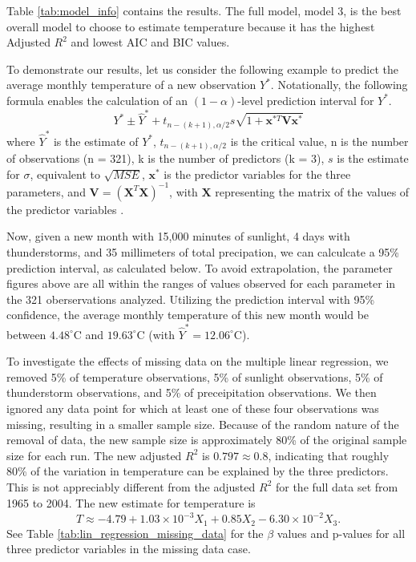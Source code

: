 Table \ref{tab:model_info} contains the results. The full model, model 3, is the best overall model to choose to estimate temperature because it has the highest Adjusted $R^{2}$ and lowest AIC and BIC values.

To demonstrate our results, let us consider the following example to predict the average monthly temperature of a new observation $Y^{*}$. Notationally, the following formula enables the calculation of an $(1-\alpha)$-level prediction interval for $Y^{*}$. $$Y^{*} \pm \hat{Y}^{*} + t_{n-(k+1),\alpha/2} s \sqrt{1+\textbf{x}^{*T}\textbf{V}\textbf{x}^{*}}$$ where $\hat{Y}^{*}$ is the estimate of $Y^{*}$, $t_{n-(k+1),\alpha/2}$ is the critical value, n is the number of observations (n = 321), k is the number of predictors (k = 3), $s$ is the estimate for $\sigma$, equivalent to $\sqrt{MSE}$, $\textbf{x}^{*}$ is the predictor variables for the three parameters, and $\textbf{V} = (\textbf{X}^{T}\textbf{X})^{-1}$, with $\textbf{X}$ representing the matrix of the values of the predictor variables \cite{tamhane}.

Now, given a new month with 15,000 minutes of sunlight, 4 days with thunderstorms, and 35 millimeters of total precipation, we can calculcate a 95\% prediction interval, as calculated below. To avoid extrapolation, the parameter figures above are all within the ranges of values observed for each parameter in the 321 oberservations analyzed. Utilizing the prediction interval with 95\% confidence, the average monthly temperature of this new month would be between $4.48^{\circ}$C and $19.63^{\circ}$C (with $\hat{Y}^{*} = 12.06^{\circ}$C).

To investigate the effects of missing data on the multiple linear regression, we removed 5\% of temperature observations, 5\% of sunlight observations, 5\% of thunderstorm observations, and 5\% of preceipitation observations. We then ignored any data point for which at least one of these four observations was missing, resulting in a smaller sample size. Because of the random nature of the removal of data, the new sample size is approximately 80\% of the original sample size for each run. The new adjusted $R^{2}$ is $0.797 \approx 0.8$, indicating that roughly 80\% of the variation in temperature can be explained by the three predictors. This is not appreciably different from the adjusted $R^{2}$ for the full data set from 1965 to 2004. The new estimate for temperature is $$\hat{T} \approx -4.79 + 1.03 \times 10^{-3}X_{1} + 0.85X_{2} - 6.30\times 10^{-2}X_{3}.$$ See Table \ref{tab:lin_regression_missing_data} for the $\beta$ values and p-values for all three predictor variables in the missing data case.
